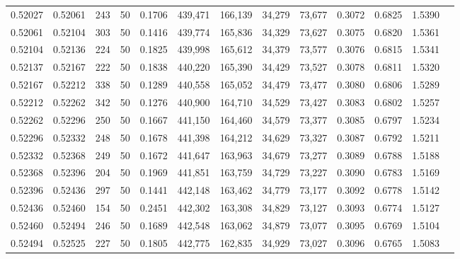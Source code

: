 \begin{tabular}{rrrrrrrrrrrrr}
0.52027 & 0.52061 &   243 &  50 &                                     0.1706 & 439,471 & 166,139 &  34,279 &  73,677 & 0.3072 & 0.6825 & 1.5390 \\
0.52061 & 0.52104 &   303 &  50 &                                     0.1416 & 439,774 & 165,836 &  34,329 &  73,627 & 0.3075 & 0.6820 & 1.5361 \\
0.52104 & 0.52136 &   224 &  50 &                                     0.1825 & 439,998 & 165,612 &  34,379 &  73,577 & 0.3076 & 0.6815 & 1.5341 \\
0.52137 & 0.52167 &   222 &  50 &                                     0.1838 & 440,220 & 165,390 &  34,429 &  73,527 & 0.3078 & 0.6811 & 1.5320 \\
0.52167 & 0.52212 &   338 &  50 &                                     0.1289 & 440,558 & 165,052 &  34,479 &  73,477 & 0.3080 & 0.6806 & 1.5289 \\
0.52212 & 0.52262 &   342 &  50 &                                     0.1276 & 440,900 & 164,710 &  34,529 &  73,427 & 0.3083 & 0.6802 & 1.5257 \\
0.52262 & 0.52296 &   250 &  50 &                                     0.1667 & 441,150 & 164,460 &  34,579 &  73,377 & 0.3085 & 0.6797 & 1.5234 \\
0.52296 & 0.52332 &   248 &  50 &                                     0.1678 & 441,398 & 164,212 &  34,629 &  73,327 & 0.3087 & 0.6792 & 1.5211 \\
0.52332 & 0.52368 &   249 &  50 &                                     0.1672 & 441,647 & 163,963 &  34,679 &  73,277 & 0.3089 & 0.6788 & 1.5188 \\
0.52368 & 0.52396 &   204 &  50 &                                     0.1969 & 441,851 & 163,759 &  34,729 &  73,227 & 0.3090 & 0.6783 & 1.5169 \\
0.52396 & 0.52436 &   297 &  50 &                                     0.1441 & 442,148 & 163,462 &  34,779 &  73,177 & 0.3092 & 0.6778 & 1.5142 \\
0.52436 & 0.52460 &   154 &  50 &                                     0.2451 & 442,302 & 163,308 &  34,829 &  73,127 & 0.3093 & 0.6774 & 1.5127 \\
0.52460 & 0.52494 &   246 &  50 &                                     0.1689 & 442,548 & 163,062 &  34,879 &  73,077 & 0.3095 & 0.6769 & 1.5104 \\
0.52494 & 0.52525 &   227 &  50 &                                     0.1805 & 442,775 & 162,835 &  34,929 &  73,027 & 0.3096 & 0.6765 & 1.5083 \\

\end{tabular}
